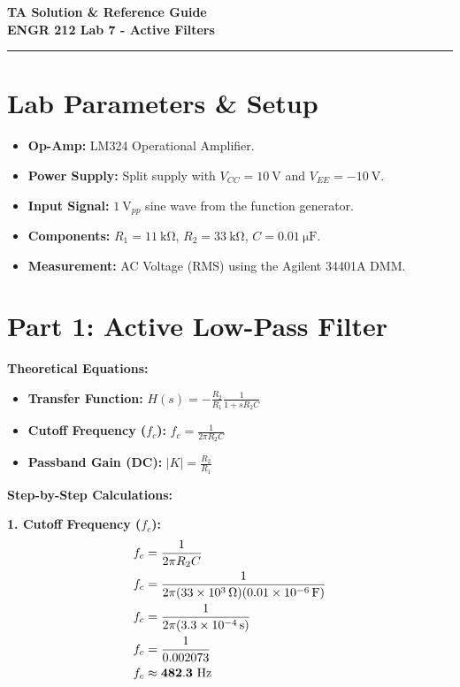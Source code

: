 \documentclass[11pt]{article}
\begin{document}
\begin{center}
  \Large\textbf{TA Solution \& Reference Guide} \\
  \vspace{0.1in}
  \huge\textbf{ENGR 212 Lab 7 - Active Filters}
\end{center}

\vspace{0.1in}
\hrule
\vspace{0.2in}

\section*{Lab Parameters \& Setup}
\begin{itemize}
  \item \textbf{Op-Amp:} LM324 Operational Amplifier.
  \item \textbf{Power Supply:} Split supply with $V_{CC} = \SI{+10}{\volt}$ and $V_{EE} = \SI{-10}{\volt}$.
  \item \textbf{Input Signal:} $\SI{1}{\volt}_{pp}$ sine wave from the function generator.
  \item \textbf{Components:} $R_1 = \SI{11}{\kilo\ohm}$, $R_2 = \SI{33}{\kilo\ohm}$, $C = \SI{0.01}{\micro\farad}$.
  \item \textbf{Measurement:} AC Voltage (RMS) using the Agilent 34401A DMM.
\end{itemize}

\vspace{0.2in}
\section*{Part 1: Active Low-Pass Filter}

\textbf{Theoretical Equations:}
\begin{itemize}
  \item \textbf{Transfer Function:} $H(s) = -\frac{R_2}{R_1} \frac{1}{1 + sR_2C}$
  \item \textbf{Cutoff Frequency ($f_c$):} $f_c = \frac{1}{2\pi R_2 C}$
  \item \textbf{Passband Gain (DC):} $|K| = \frac{R_2}{R_1}$
\end{itemize}

\textbf{Step-by-Step Calculations:}

\textbf{1. Cutoff Frequency ($f_c$):}
\begin{align*}
  f_c &= \frac{1}{2\pi R_2 C} \\
  f_c &= \frac{1}{2\pi (\SI{33e3}{\ohm})(\SI{0.01e-6}{\farad})} \\
  f_c &= \frac{1}{2\pi (\SI{3.3e-4}{\second})} \\
  f_c &= \frac{1}{0.002073} \\
  f_c &\approx \mathbf{482.3 \text{ \si{\hertz}}}
\end{align*}
\end{document}
